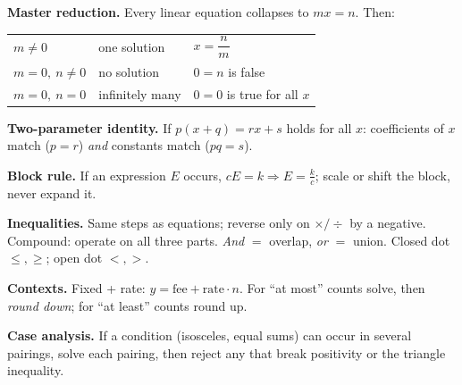 \documentclass[10pt]{article}
\begin{document}
\textbf{Master reduction.} Every linear equation collapses to $mx=n$. Then:
\begin{center}\begin{tabular}{@{}lll@{}}\toprule
$m\ne0$ & one solution & $x=\dfrac nm$\\
$m=0,\ n\ne0$ & no solution & $0=n$ is false\\
$m=0,\ n=0$ & infinitely many & $0=0$ is true for all $x$\\\bottomrule\end{tabular}\end{center}

\textbf{Two-parameter identity.} If $p(x+q)=rx+s$ holds for all $x$: coefficients of $x$ match ($p=r$) \emph{and} constants match ($pq=s$).

\textbf{Block rule.} If an expression $E$ occurs, $cE=k\Rightarrow E=\frac kc$; scale or shift the block, never expand it.

\textbf{Inequalities.} Same steps as equations; reverse only on $\times/\div$ by a negative. Compound: operate on all three parts. \emph{And} $=$ overlap, \emph{or} $=$ union. Closed dot $\le,\ge$; open dot $<,>$.

\textbf{Contexts.} Fixed + rate: $y=\text{fee}+\text{rate}\cdot n$. For ``at most'' counts solve, then \emph{round down}; for ``at least'' counts round up.

\textbf{Case analysis.} If a condition (isosceles, equal sums) can occur in several pairings, solve each pairing, then reject any that break positivity or the triangle inequality.
\end{document}
